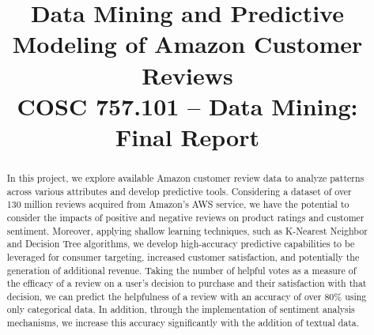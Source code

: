 \documentclass[10pt, conference, compsocconf]{IEEEtran}
\begin{document}
\title{Data Mining and Predictive Modeling of Amazon Customer Reviews \\ {\large COSC 757.101 – Data Mining:  Final Report}}

\newcommand{\superast}{\raisebox{9pt}{$\ast$}}
\newcommand{\superdagger}{\raisebox{9pt}{$\dagger$}}
\newcommand{\superddagger}{\raisebox{9pt}{$\ddagger$}}
\newcommand{\superS}{\raisebox{9pt}{$\S$}}
\newcommand{\superP}{\raisebox{9pt}{$\P$}}

\author{
}

\maketitle

\begin{abstract}

In this project, we explore available Amazon customer review data to analyze patterns across various attributes and develop predictive tools. Considering a dataset of over 130 million reviews acquired from Amazon's AWS service, we have the potential to consider the impacts of positive and negative reviews on product ratings and customer sentiment. Moreover, applying shallow learning techniques, such as K-Nearest Neighbor and Decision Tree algorithms, we develop high-accuracy predictive capabilities to be leveraged for consumer targeting, increased customer satisfaction, and potentially the generation of additional revenue. Taking the number of helpful votes as a measure of the efficacy of a review on a user's decision to purchase and their satisfaction with that decision, we can predict the helpfulness of a review with an accuracy of over 80\% using only categorical data. In addition, through the implementation of sentiment analysis mechanisms, we increase this accuracy significantly with the addition of textual data.
\end{abstract}
\end{document}
